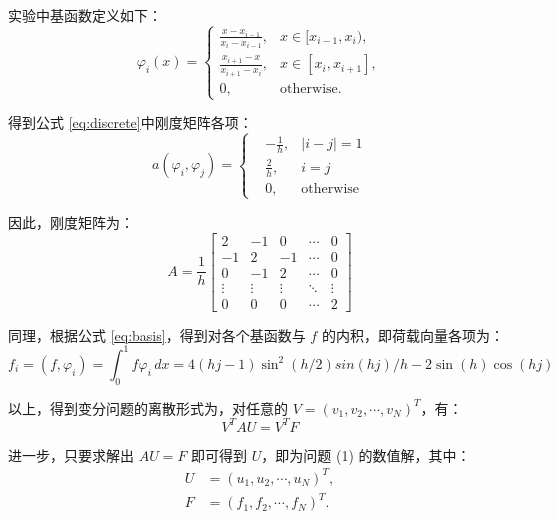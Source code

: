 \documentclass[11pt]{ctexart}
\begin{document}
	实验中基函数定义如下：
	\begin{equation}
		\varphi_i(x) = 
		\begin{cases} 
		\frac{x - x_{i-1}}{x_i - x_{i-1}}, & x \in [x_{i-1}, x_i), \\
		\frac{x_{i+1} - x}{x_{i+1} - x_i}, & x \in [x_i, x_{i+1}], \\
		0, & \text{otherwise}.
		\end{cases}
		\label{eq:basis}
	\end{equation}
	
	得到公式 \eqref{eq:discrete}中刚度矩阵各项：
	\begin{equation} 
		a(\varphi_i, \varphi_j)=\left\{
		\begin{aligned}
			&-\frac{1}{h}, & |i-j| = 1\\
			&\frac{2}{h}, &i = j\\
			&0,  &\text{otherwise}
		\end{aligned}
		\right.
	\end{equation}
	
	因此，刚度矩阵为：
	\begin{equation}
		A = \frac{1}{h}\begin{bmatrix}
			2 & -1 & 0 & \cdots & 0 \\
			-1 & 2 & -1 & \cdots & 0 \\
			0 & -1 & 2 & \cdots & 0 \\
			\vdots & \vdots & \vdots & \ddots & \vdots \\
			0 & 0 & 0 & \cdots & 2
		\end{bmatrix}
	\end{equation}

	同理，根据公式 \eqref{eq:basis}，得到对各个基函数与 $f$ 的内积，即荷载向量各项为：
	\begin{equation}
		f_i = (f, \varphi_i) = \int_0^1 f \varphi_i \, dx = 4(hj-1)\sin^2(h/2)sin(hj)/h-2\sin(h)\cos(hj)
	\end{equation}

	以上，得到变分问题的离散形式为，对任意的 $ V=(v_1,v_2,\cdots,v_{N})^T $，有： 
	\begin{equation}
		V^TAU = V^TF
	\end{equation}

	进一步，只要求解出 $ AU = F $ 即可得到 $ U $，即为问题 (1) 的数值解，其中：
	\begin{equation}
		\begin{aligned}
			U &= (u_1, u_2, \cdots, u_{N})^T, \\
			F &= (f_1, f_2, \cdots, f_{N})^T.
		\end{aligned}
	\end{equation} 
\end{document}
